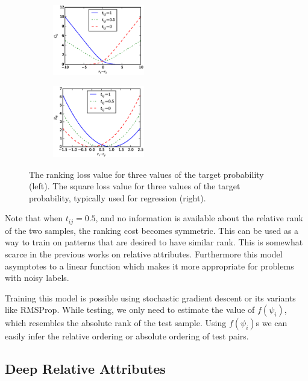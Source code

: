 \begin{figure}
    \centering
    \begin{subfigure}
        \centering
        \includegraphics[width=4cm]{fig2-2/fig3.eps}
    \end{subfigure}
    \begin{subfigure}
        \centering
        \includegraphics[width=4cm]{fig2-2/fig3-reg.eps}
    \end{subfigure}
    \caption{The ranking loss value for three values of the target probability (left). The square loss value for three values of the target probability, typically used for regression (right).}
    \label{fig.2}
\end{figure}

Note that when $t_{ij} = 0.5$, and no information is available about the relative rank of the two samples, the ranking cost becomes symmetric. This can be used as a way to train on patterns that are desired to have similar rank. This is somewhat scarce in the previous works on relative attributes.
Furthermore this model asymptotes to a linear function which makes it more appropriate for problems with noisy labels. %

Training this model is possible using stochastic gradient descent or its variants like RMSProp.%
While testing, we only need to estimate the value of $f(\psi_i)$, which resembles the absolute rank of the test sample. Using $f(\psi_i)$s we can easily infer the relative ordering or absolute ordering of test pairs.

\subsection{Deep Relative Attributes}\label{sec3.2}


